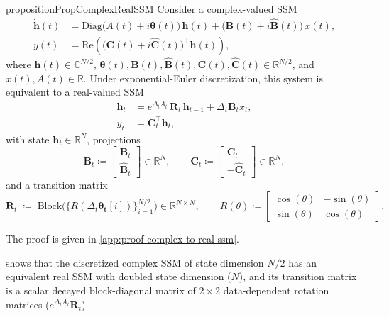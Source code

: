 \documentclass{article}
\def\vh{{\bm{h}}}
\def\bB{{\bm{B}}}
\def\bC{{\bm{C}}}
\def\bR{{\bm{R}}}
\theoremstyle{plain}
\theoremstyle{definition}
\theoremstyle{remark}
\begin{document}
\begin{restatable}{proposition}{PropComplexRealSSM}\label{prop:complex-to-real-ssm}
Consider a complex-valued SSM
\begin{align}
\label{eq:complex-ssm}
    \dot{\vh}(t) &= \mathrm{Diag}\big(A(t) + i \boldsymbol{\theta}(t)\big)\,\vh(t) 
    + \big(\bB(t) + i\hat{\bB}(t)\big)\,x(t), \\ \nonumber
    y(t) &= \mathrm{Re}\!\left(
        \big(\bC(t) + i\hat{\bC}(t)\big)^{\top}\vh(t)
    \right),
\end{align}
where $\vh(t) \in \mathbb{C}^{N/2}$, $\boldsymbol{\theta}(t),\bB(t),\hat{\bB}(t),\bC(t),\hat{\bC}(t)\in\mathbb{R}^{N/2}$, and $x(t),A(t)\in\mathbb{R}$.
Under exponential-Euler discretization, this system is equivalent to a real-valued SSM
\begin{align}
\label{eq:real-ssm}
    \vh_t &= e^{\Delta_t A_t}\,\bR_t\,\vh_{t-1} + \Delta_t \bB_t x_t, \\  \nonumber
    y_t   &= \bC_t^{\top}\vh_t,
\end{align}
with state $\vh_t \in \mathbb{R}^N$, projections 
\[
\bB_t \coloneqq \begin{bmatrix} \bB_t \\ \hat{\bB}_t \end{bmatrix} \in \mathbb{R}^N, 
\qquad 
\bC_t \coloneqq \begin{bmatrix} \bC_t \\ -\hat{\bC}_t \end{bmatrix} \in \mathbb{R}^N, 
\]
and a transition matrix 
\[
\bR_t \;\coloneqq\; \text{Block}\Big(\{R(\Delta_t \boldsymbol{\theta_t}[i])\}_{i=1}^{N/2}\Big)
\in \mathbb{R}^{N \times N}
,
\qquad 
R(\theta) \coloneqq 
\begin{bmatrix}
    \cos(\theta) & -\sin(\theta) \\
    \sin(\theta) & \cos(\theta)
\end{bmatrix}.
\]
\end{restatable}

The proof is given in \cref{app:proof-complex-to-real-ssm}. 

 shows that the discretized complex SSM of state dimension $N/2$ has an equivalent real SSM with doubled state dimension ($N$), and its transition matrix is a scalar decayed block-diagonal matrix of $2\times2$ data-dependent rotation matrices ($e^{\Delta_t A_t} \bR_t$).
\end{document}
